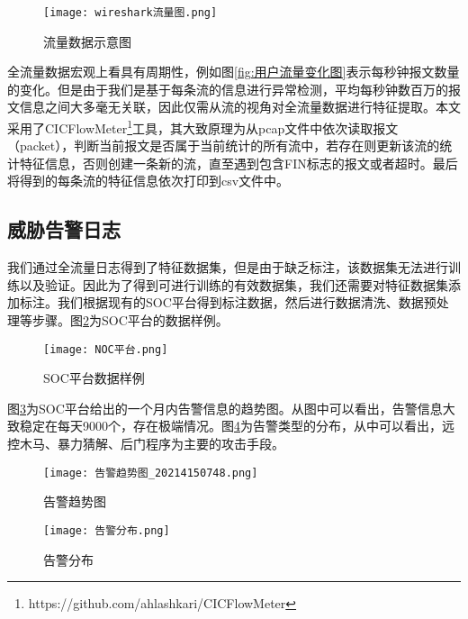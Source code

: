 \begin{figure}
    \centering
    \texttt{[image: wireshark流量图.png]}
    \caption{流量数据示意图}
    \label{fig:wireshark}
  \end{figure}

全流量数据宏观上看具有周期性，例如图\ref{fig:用户流量变化图}表示每秒钟报文数量的变化。但是由于我们是基于每条流的信息进行异常检测，平均每秒钟数百万的报文信息之间大多毫无关联，因此仅需从流的视角对全流量数据进行特征提取。本文采用了CICFlowMeter\footnote{https://github.com/ahlashkari/CICFlowMeter}工具，其大致原理为从pcap文件中依次读取报文（packet），判断当前报文是否属于当前统计的所有流中，若存在则更新该流的统计特征信息，否则创建一条新的流，直至遇到包含FIN标志的报文或者超时。最后将得到的每条流的特征信息依次打印到csv文件中。


\subsection{威胁告警日志}
我们通过全流量日志得到了特征数据集，但是由于缺乏标注，该数据集无法进行训练以及验证。因此为了得到可进行训练的有效数据集，我们还需要对特征数据集添加标注。我们根据现有的SOC平台得到标注数据，然后进行数据清洗、数据预处理等步骤。图\ref{fig:NOC平台数据样例}为SOC平台的数据样例。
\begin{figure}
    \centering
    \texttt{[image: NOC平台.png]}
    \caption{SOC平台数据样例}
    \label{fig:NOC平台数据样例}
  \end{figure}


图\ref{fig:告警趋势图}为SOC平台给出的一个月内告警信息的趋势图。从图中可以看出，告警信息大致稳定在每天9000个，存在极端情况。图\ref{fig:告警分布}为告警类型的分布，从中可以看出，远控木马、暴力猜解、后门程序为主要的攻击手段。
\begin{figure}
    \centering
    \texttt{[image: 告警趋势图\_20214150748.png]}
    \caption{告警趋势图}
    \label{fig:告警趋势图}
  \end{figure}
  \begin{figure}
    \centering
    \texttt{[image: 告警分布.png]}
    \caption{告警分布}
    \label{fig:告警分布}
  \end{figure}


